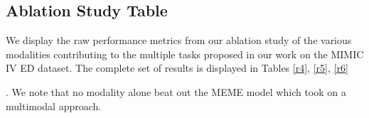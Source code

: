 \documentclass{article}
\theoremstyle{plain}
\theoremstyle{definition}
\theoremstyle{remark}
\begin{document}
{%



\newpage
\subsection{Ablation Study Table}
\label{ablation}

We display the raw performance metrics from our ablation study of the various modalities contributing to the multiple tasks proposed in our work on the MIMIC IV ED dataset. The complete set of results is displayed in Tables \ref{r4}, \ref{r5}, \ref{r6}}. We note that no modality alone beat out the MEME model which took on a multimodal approach. 
\end{document}
